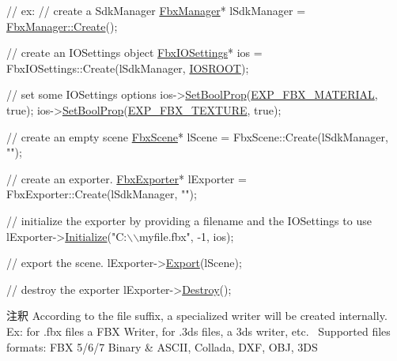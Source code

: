 \begin{DoxyCode}
\textcolor{comment}{// ex:}
\textcolor{comment}{// create a SdkManager}
\hyperlink{class_fbx_manager}{FbxManager}* lSdkManager = \hyperlink{class_fbx_manager_af51cafc0f34f17d497f7921d847a4dd4}{FbxManager::Create}();

\textcolor{comment}{// create an IOSettings object}
\hyperlink{class_fbx_i_o_settings}{FbxIOSettings}* ios = FbxIOSettings::Create(lSdkManager, \hyperlink{fbxiosettingspath_8h_a57a5e54b72d0f2936d5ee84d8f510a0a}{IOSROOT});

\textcolor{comment}{// set some IOSettings options }
ios->\hyperlink{class_fbx_i_o_settings_ad2c660ef846b66dcf569079299391745}{SetBoolProp}(\hyperlink{fbxiosettingspath_8h_a204bbd602ba341a20acf870eef02027f}{EXP\_FBX\_MATERIAL}, \textcolor{keyword}{true});
ios->\hyperlink{class_fbx_i_o_settings_ad2c660ef846b66dcf569079299391745}{SetBoolProp}(\hyperlink{fbxiosettingspath_8h_a157289a61920fd4b968bf370077222b2}{EXP\_FBX\_TEXTURE},  \textcolor{keyword}{true});

\textcolor{comment}{// create an empty scene}
\hyperlink{class_fbx_scene}{FbxScene}* lScene = FbxScene::Create(lSdkManager, \textcolor{stringliteral}{""});

\textcolor{comment}{// create an exporter.}
\hyperlink{class_fbx_exporter}{FbxExporter}* lExporter = FbxExporter::Create(lSdkManager, \textcolor{stringliteral}{""});

\textcolor{comment}{// initialize the exporter by providing a filename and the IOSettings to use}
lExporter->\hyperlink{class_fbx_exporter_acab60199145f0c86b80fac8ed7e1b239}{Initialize}(\textcolor{stringliteral}{"C:\(\backslash\)\(\backslash\)myfile.fbx"}, -1, ios);

\textcolor{comment}{// export the scene.}
lExporter->\hyperlink{class_fbx_exporter_a8a92372cf76fe3486a798c87973cc791}{Export}(lScene); 
 
\textcolor{comment}{// destroy the exporter}
lExporter->\hyperlink{class_fbx_object_a7b49e6a0c17132cd7e2e7e8485a08915}{Destroy}();
\end{DoxyCode}


\begin{DoxyRemark}{注釈}
According to the file suffix, a specialized writer will be created internally.~\newline
 Ex\+: for .fbx files a F\+BX Writer, for .3ds files, a 3ds writer, etc.~\newline
 Supported files formats\+: F\+BX 5/6/7 Binary \& A\+S\+C\+II, Collada, D\+XF, O\+BJ, 3\+DS 
\end{DoxyRemark}


